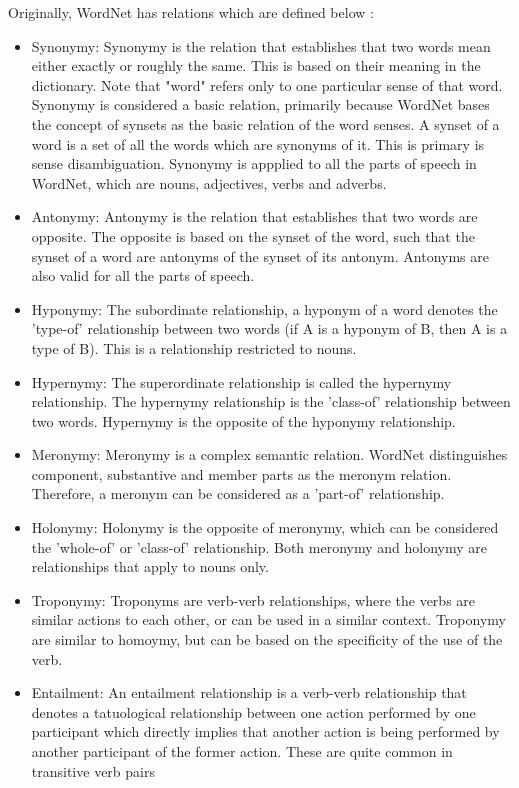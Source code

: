 \documentclass[final, 12pt]{elsarticle}
\begin{document}
Originally, WordNet has relations which are defined below \citep{miller1995wordnet}:
\begin{itemize}
    \item Synonymy: Synonymy is the relation that establishes that two words mean either exactly or roughly the same. This is based on their meaning in the dictionary. Note that "word" refers only to one particular sense of that word. Synonymy is considered a basic relation, primarily because WordNet bases the concept of synsets as the basic relation of the word senses. A synset of a word is a set of all the words which are synonyms of it. This is primary is sense disambiguation. Synonymy is appplied to all the parts of speech in WordNet, which are nouns, adjectives, verbs and adverbs. 
    \item Antonymy: Antonymy is the relation that establishes that two words are opposite. The opposite is based on the synset of the word, such that the synset of a word are antonyms of the synset of its antonym. Antonyms are also valid for all the parts of speech.
    \item Hyponymy: The subordinate relationship, a hyponym of a word denotes the 'type-of' relationship between two words (if A is a hyponym of B, then A is a type of B). This is a relationship restricted to nouns.  
    \item Hypernymy: The superordinate relationship is called the hypernymy relationship. The hypernymy relationship is the 'class-of' relationship between two words. Hypernymy is the opposite of the hyponymy relationship.
    \item Meronymy: Meronymy is a complex semantic relation. WordNet distinguishes component, substantive and member parts as the meronym relation. Therefore, a meronym can be considered as a 'part-of' relationship.
    \item Holonymy: Holonymy is the opposite of meronymy, which can be considered the 'whole-of' or 'class-of' relationship. Both meronymy and holonymy are relationships that apply to nouns only.
    \item Troponymy: Troponyms are verb-verb relationships, where the verbs are similar actions to each other, or can be used in a similar context. Troponymy are similar to homoymy, but can be based on the specificity of the use of the verb.
    \item Entailment: An entailment relationship is a verb-verb relationship that denotes a tatuological relationship between one action performed by one participant which directly implies that another action is being performed by another participant of the former action. These are quite common in transitive verb pairs
\end{itemize}
\end{document}
